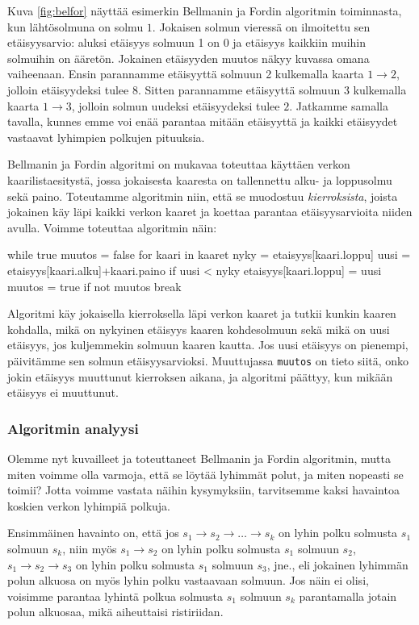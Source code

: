 Kuva \ref{fig:belfor} näyttää esimerkin Bellmanin ja Fordin algoritmin toiminnasta,
kun lähtösolmuna on solmu $1$.
Jokaisen solmun vieressä on ilmoitettu sen etäisyysarvio:
aluksi etäisyys solmuun 1 on 0 ja etäisyys kaikkiin muihin solmuihin on ääretön.
Jokainen etäisyyden muutos näkyy kuvassa omana vaiheenaan.
Ensin parannamme etäisyyttä solmuun 2
kulkemalla kaarta $1 \rightarrow 2$,
jolloin etäisyydeksi tulee $8$.
Sitten parannamme etäisyyttä solmuun $3$
kulkemalla kaarta $1 \rightarrow 3$,
jolloin solmun uudeksi etäisyydeksi tulee $2$.
Jatkamme samalla tavalla, kunnes emme voi enää parantaa
mitään etäisyyttä ja kaikki etäisyydet
vastaavat lyhimpien polkujen pituuksia.

Bellmanin ja Fordin algoritmi on mukavaa toteuttaa
käyttäen verkon kaarilistaesitystä,
jossa jokaisesta kaaresta on tallennettu alku- ja loppusolmu sekä paino.
Toteutamme algoritmin niin,
että se muodostuu \emph{kierroksista},
joista jokainen käy läpi kaikki verkon kaaret
ja koettaa parantaa etäisyysarvioita niiden avulla.
Voimme toteuttaa algoritmin näin:

\begin{code}
while true
    muutos = false
    for kaari in kaaret
        nyky = etaisyys[kaari.loppu]
        uusi = etaisyys[kaari.alku]+kaari.paino
        if uusi < nyky
            etaisyys[kaari.loppu] = uusi
            muutos = true
    if not muutos
        break
\end{code}

Algoritmi käy jokaisella kierroksella läpi verkon kaaret
ja tutkii kunkin kaaren kohdalla,
mikä on nykyinen etäisyys kaaren kohdesolmuun
sekä mikä on uusi etäisyys, jos kuljemmekin solmuun kaaren kautta.
Jos uusi etäisyys on pienempi, päivitämme
sen solmun etäisyysarvioksi.
Muuttujassa \texttt{muutos} on tieto siitä,
onko jokin etäisyys muuttunut kierroksen aikana,
ja algoritmi päättyy, kun mikään etäisyys ei muuttunut.

\subsubsection{Algoritmin analyysi}

Olemme nyt kuvailleet ja toteuttaneet Bellmanin ja Fordin
algoritmin, mutta miten voimme olla varmoja,
että se löytää lyhimmät polut, ja miten nopeasti se toimii?
Jotta voimme vastata näihin kysymyksiin,
tarvitsemme kaksi havaintoa koskien verkon lyhimpiä polkuja.

Ensimmäinen havainto on, että jos
$s_1 \rightarrow s_2 \rightarrow \dots \rightarrow s_k$ on
lyhin polku solmusta $s_1$ solmuun $s_k$,
niin myös $s_1 \rightarrow s_2$ on lyhin polku solmusta $s_1$ solmuun $s_2$,
$s_1 \rightarrow s_2 \rightarrow s_3$ on lyhin polku solmusta $s_1$ solmuun $s_3$, jne.,
eli jokainen lyhimmän polun alkuosa on myös lyhin polku vastaavaan solmuun.
Jos näin ei olisi, voisimme parantaa lyhintä polkua solmusta $s_1$ solmuun $s_k$
parantamalla jotain polun alkuosaa, mikä aiheuttaisi ristiriidan.

